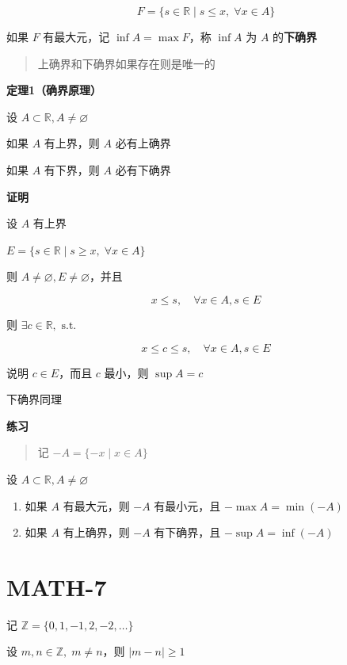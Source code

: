 \[
F=\{ s \in \mathbb{R} \mid s \leq x,\; \forall x \in A \}
\]

如果 \(F\) 有最大元，记 \(\inf A =\max F\)，称 \(\inf A\) 为 \(A\)
的\textbf{下确界}

\begin{quote}
上确界和下确界如果存在则是唯一的
\end{quote}

\textbf{定理1（确界原理）}

设 \(A \subset \mathbb{R}, A\neq\varnothing\)

如果 \(A\) 有上界，则 \(A\) 必有上确界

如果 \(A\) 有下界，则 \(A\) 必有下确界

\textbf{证明}

设 \(A\) 有上界

\(E=\{ s \in \mathbb{R} \mid s\geq x, \; \forall x \in A \}\)

则 \(A\neq \varnothing, E\neq\varnothing\)，并且

\[
x\leq s, \quad \forall x \in A, s \in E
\]

则 \(\exists c \in \mathbb{R}, \text{ s.t. }\)

\[
x\leq c\leq s, \quad \forall x \in A, s \in E
\]

说明 \(c \in E\)，而且 \(c\) 最小，则 \(\sup A=c\)

下确界同理

\textbf{练习}

\begin{quote}
记 \(-A=\{ -x \mid x \in A \}\)
\end{quote}

设 \(A\subset \mathbb{R}, A\neq\varnothing\)

\begin{enumerate}
\def\labelenumi{\arabic{enumi}.}
\tightlist
\item
  如果 \(A\) 有最大元，则 \(-A\) 有最小元，且 \(-\max A=\min(-A)\)
\item
  如果 \(A\) 有上确界，则 \(-A\) 有下确界，且 \(-\sup A=\inf(-A)\)
\end{enumerate}

\section{MATH-7}\label{math-7}

记 \(\mathbb{Z}=\{ 0, 1, -1, 2, -2, \dots \}\)

设 \(m, n \in \mathbb{Z}, \; m\neq n\)，则 \(|m-n|\geq 1\)

